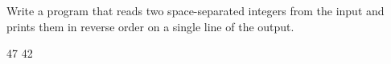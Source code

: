 




Write a program that reads two space-separated integers from the input and prints them in reverse order on a single line of the output.

 47
 42
\koniec

